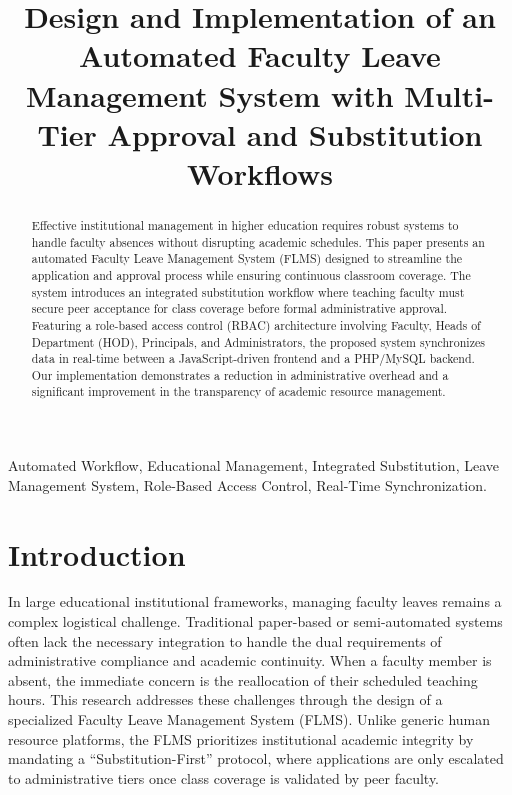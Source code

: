 \documentclass[conference]{IEEEtran}
\begin{document}
\title{Design and Implementation of an Automated Faculty Leave Management System with Multi-Tier Approval and Substitution Workflows}

\author{
}

\maketitle

\begin{abstract}
Effective institutional management in higher education requires robust systems to handle faculty absences without disrupting academic schedules. This paper presents an automated Faculty Leave Management System (FLMS) designed to streamline the application and approval process while ensuring continuous classroom coverage. The system introduces an integrated substitution workflow where teaching faculty must secure peer acceptance for class coverage before formal administrative approval. Featuring a role-based access control (RBAC) architecture involving Faculty, Heads of Department (HOD), Principals, and Administrators, the proposed system synchronizes data in real-time between a JavaScript-driven frontend and a PHP/MySQL backend. Our implementation demonstrates a reduction in administrative overhead and a significant improvement in the transparency of academic resource management.
\end{abstract}

\begin{IEEEkeywords}
Automated Workflow, Educational Management, Integrated Substitution, Leave Management System, Role-Based Access Control, Real-Time Synchronization.
\end{IEEEkeywords}

\section{Introduction}
In large educational institutional frameworks, managing faculty leaves remains a complex logistical challenge. Traditional paper-based or semi-automated systems often lack the necessary integration to handle the dual requirements of administrative compliance and academic continuity. When a faculty member is absent, the immediate concern is the reallocation of their scheduled teaching hours. This research addresses these challenges through the design of a specialized Faculty Leave Management System (FLMS). Unlike generic human resource platforms, the FLMS prioritizes institutional academic integrity by mandating a ``Substitution-First'' protocol, where applications are only escalated to administrative tiers once class coverage is validated by peer faculty.
\end{document}
